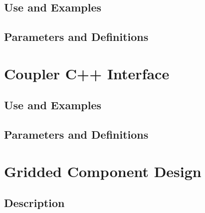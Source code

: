 \documentclass[]{article}
\begin{document}
\subsection{Use and Examples}




\subsection{Parameters and Definitions}








\section{Coupler C++ Interface}

\subsection{Use and Examples}




\subsection{Parameters and Definitions}











\section{Gridded Component Design}

\subsection{Description}


\end{document}

